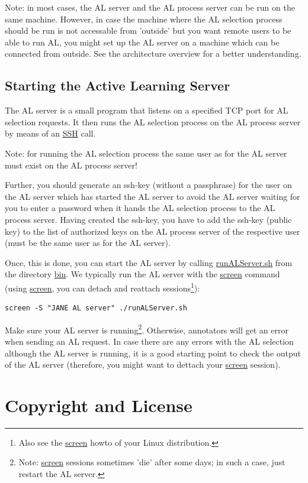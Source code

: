 \documentclass[DIV12,english,11pt,halfparskip]{scrartcl}
\begin{document}
Note: in most cases, the AL server and the AL process server can be
run on the same machine. However, in case the machine where the AL
selection process should be run is not accessable from 'outside' but
you want remote users to be able to run AL, you might set up the AL
server on a machine which can be connected from outside. See the
architecture overview for a better understanding.


\subsection{Starting the Active Learning Server}
The AL server is a small program that listens on a specified TCP port
for AL selection requests. It then runs the AL selection process on
the AL process server by means of an \url{SSH} call. 

Note: for running the AL selection process the same user as for the AL
server must exist on the AL process server!

Further, you should generate an ssh-key (without a passphrase) for the
user on the AL server which has started the AL server to avoid the AL
server waiting for you to enter a password when it hands the AL
selection process to the AL process server. Having created the ssh-key,
you have to add the ssh-key (public key) to the list of authorized
keys on the AL process server of the respective user (must be the same
user as for the AL server).

Once, this is done, you can start the AL server by calling
\url{runALServer.sh} from the directory \url{bin}. We typically run
the AL server with the \url{screen} command (using \url{screen}, you
can detach and reattach sessions\footnote{Also see the \url{screen}
  howto of your Linux distribution.}):

\begin{verbatim}
screen -S "JANE AL server" ./runALServer.sh
\end{verbatim}

Make sure your AL server is running\footnote{Note: \url{screen}
  sessions sometimes 'die' after some days; in such a case, just
  restart the AL server.}. Otherwise, annotators will get an error when
sending an AL request. In case there are any errors with the AL
selection although the AL server is running, it is a good starting
point to check the output of the AL server (therefore, you might want
to dettach your \url{screen} session).


\section{Copyright and License}
\end{document}
